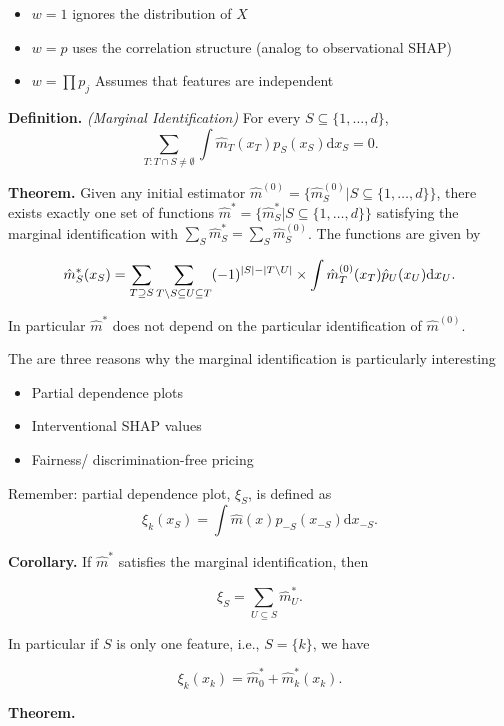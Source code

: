 \documentclass[
]{book}
\providecommand{\tightlist}{%
  \setlength{\itemsep}{0pt}\setlength{\parskip}{0pt}}
\begin{document}
\begin{itemize}
\tightlist
\item
  \(w=1\) ignores the distribution of \(X\)
\item
  \(w=p\) uses the correlation structure (analog to observational SHAP)
\item
  \(w=\prod p_j\) Assumes that features are independent
\end{itemize}

\textbf{Definition.} \emph{(Marginal Identification)} For every \(S\subseteq \{1,\dots,d\}\),
\[
\sum_{T: T \cap S \neq \emptyset} \int  \hat m_T(x_T)  p_{S}(x_{S}) \mathrm dx_S=0.
\]

\textbf{Theorem.} Given any initial estimator \(\hat m^{(0)}=\{\hat m^{(0)}_S | S\subseteq \{1,\dots,d\}\}\),
there exists exactly one set of functions \(\hat m^\ast=\{\hat m^\ast_S | S\subseteq \{1,\dots,d\}\}\) satisfying the marginal identification with \(\sum_S \hat m^\ast_S = \sum_S \hat m^{(0)}_S\).
The functions are given by

\[
\hat m^\ast_S (x_S)=  \sum_{T \supseteq S} \sum_{T\setminus S \subseteq U\subseteq  T}(-1)^{|S|-|T\setminus U|} \times \int \hat m^{(0)}_T(x_T) \hat p_U(x_U)\mathrm dx_U. \notag
\]

In particular \(\hat m^\ast\) does not depend on the particular identification of \(\hat m^{(0)}\).

The are three reasons why the marginal identification is particularly interesting

\begin{itemize}
\tightlist
\item
  Partial dependence plots
\item
  Interventional SHAP values
\item
  Fairness/ discrimination-free pricing
\end{itemize}

Remember: partial dependence plot, \(\xi_S\), is defined as
\[\xi_k(x_S)= \int \hat m(x) p_{-S}(x_{-S})\mathrm dx_{-S}.\]

\textbf{Corollary.} If \(\hat m^{\ast}\) satisfies the marginal identification, then

\[
\xi_S=\sum_{U \subseteq S} \hat m_U^{\ast}.
\]

In particular if \(S\) is only one feature, i.e., \(S=\{k\}\), we have

\[
\xi_k(x_k)= \hat m_0^{\ast} + \hat m_k^\ast(x_k).
\]

\textbf{Theorem.}
\end{document}
